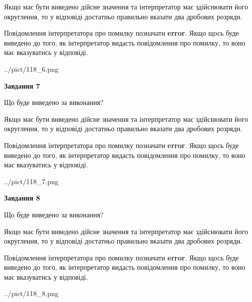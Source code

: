 \documentclass[12pt, ukrainian]{article}
\begin{document}
{\begin {Large}
Якщо має бути виведено дійсне значення та інтерпретатор має здійснювати його округлення, 
то у відповіді достатньо правильно вказати два дробових розряди.

Повідомлення інтерпретатора про помилку позначати \textbf{error}.
Якщо щось буде виведено до того, як інтерпретатор видасть повідомлення про помилку, 
то воно має вказуватись у відповіді. \par

\begin{center}
	{../pict/118_6.png}
\end{center}
\newpage

{\begin {center}\textbf{Завдання 7}\end {center}}\par
Що буде виведено за виконання? \par

Якщо має бути виведено дійсне значення та інтерпретатор має здійснювати його округлення, 
то у відповіді достатньо правильно вказати два дробових розряди.

Повідомлення інтерпретатора про помилку позначати \textbf{error}.
Якщо щось буде виведено до того, як інтерпретатор видасть повідомлення про помилку, 
то воно має вказуватись у відповіді. \par

\begin{center}
	{../pict/118_7.png}
\end{center}
\newpage

{\begin {center}\textbf{Завдання 8}\end {center}}\par
Що буде виведено за виконання? \par

Якщо має бути виведено дійсне значення та інтерпретатор має здійснювати його округлення, 
то у відповіді достатньо правильно вказати два дробових розряди.

Повідомлення інтерпретатора про помилку позначати \textbf{error}.
Якщо щось буде виведено до того, як інтерпретатор видасть повідомлення про помилку, 
то воно має вказуватись у відповіді. \par

\begin{center}
	{../pict/118_8.png}
\end{center}
\newpage


\end{Large}}
\end{document}

